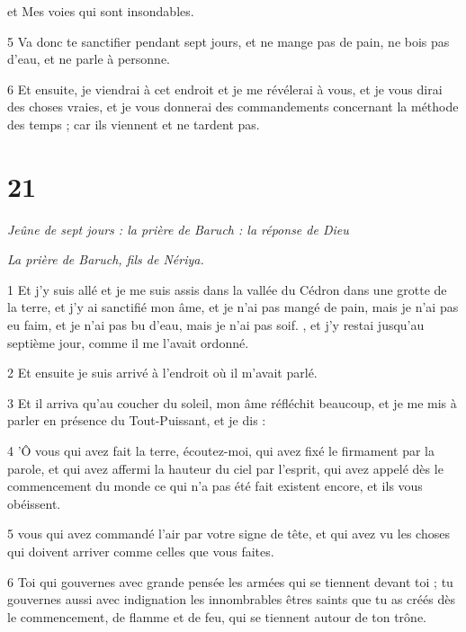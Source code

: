 \par et Mes voies qui sont insondables.

\par 5 Va donc te sanctifier pendant sept jours, et ne mange pas de pain, ne bois pas d'eau, et ne parle à personne.

\par 6 Et ensuite, je viendrai à cet endroit et je me révélerai à vous, et je vous dirai des choses vraies, et je vous donnerai des commandements concernant la méthode des temps ; car ils viennent et ne tardent pas.

\chapter{21}

\par \textit{Jeûne de sept jours : la prière de Baruch : la réponse de Dieu}

\par \textit{La prière de Baruch, fils de Nériya.}

\par 1 Et j'y suis allé et je me suis assis dans la vallée du Cédron dans une grotte de la terre, et j'y ai sanctifié mon âme, et je n'ai pas mangé de pain, mais je n'ai pas eu faim, et je n'ai pas bu d'eau, mais je n'ai pas soif. , et j'y restai jusqu'au septième jour, comme il me l'avait ordonné.

\par 2 Et ensuite je suis arrivé à l'endroit où il m'avait parlé.

\par 3 Et il arriva qu'au coucher du soleil, mon âme réfléchit beaucoup, et je me mis à parler en présence du Tout-Puissant, et je dis :

\par 4 'Ô vous qui avez fait la terre, écoutez-moi, qui avez fixé le firmament par la parole, et qui avez affermi la hauteur du ciel par l'esprit, qui avez appelé dès le commencement du monde ce qui n'a pas été fait existent encore, et ils vous obéissent.

\par 5 vous qui avez commandé l'air par votre signe de tête, et qui avez vu les choses qui doivent arriver comme celles que vous faites.

\par 6 Toi qui gouvernes avec grande pensée les armées qui se tiennent devant toi ; tu gouvernes aussi avec indignation les innombrables êtres saints que tu as créés dès le commencement, de flamme et de feu, qui se tiennent autour de ton trône.

